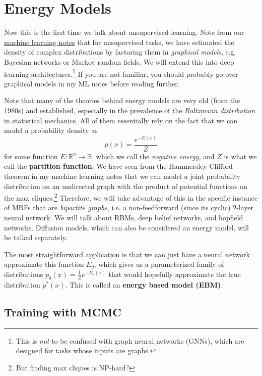 \section{Energy Models} 

  Now this is the first time we talk about unsupervised learning. Note from our  \hyperref[ml-sec:graphical_models]{machine learning notes} that for unsupervised tasks, we have estimated the density of complex distributions by factoring them in \textit{graphical models}, e.g. Bayesian networks or Markov random fields. We will extend this into deep learning architectures.\footnote{This is \textit{not} to be confused with graph neural networks (GNNs), which are designed for tasks whose inputs are graphs.} If you are not familiar, you should probably go over graphical models in my ML notes before reading further. 

  Note that many of the theories behind energy models are very old (from the 1980s) and established, especially in the prevalence of the \textit{Boltzmann distribution} in statistical mechanics. All of them essentially rely on the fact that we can model a probability density as 
  \begin{equation}
    p(x) = \frac{e^{-E(x)}}{Z}
  \end{equation}
  for some function $E: \mathbb{R}^n \rightarrow \mathbb{R}$, which we call the \textit{negative energy}, and $Z$ is what we call the \textbf{partition function}. We have seen from the Hammersley-Clifford theorem in my machine learning notes that we can model a joint probability distribution on an undirected graph with the product of potential functions on the max cliques.\footnote{But finding max cliques is NP-hard?} Therefore, we will take advantage of this in the specific instance of MRFs that are \textit{bipartite graphs}, i.e. a non-feedforward (since its cyclic) 2-layer neural network. We will talk about RBMs, deep belief networks, and hopfield networks. Diffusion models, which can also be considered an energy model, will be talked separately. 

  The most straightforward application is that we can just have a neural network approximate this function $E_\theta$, which gives us a parameterized family of distributions $p_\theta (x) = \frac{1}{Z} e^{-E_\theta (x)}$ that would hopefully approximate the true distribution $p^\ast (x)$. This is called an \textbf{energy based model (EBM)}. 

\subsection{Training with MCMC}

